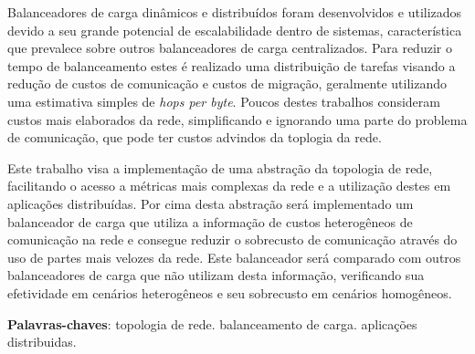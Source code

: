 \documentclass[
	12pt,				%
	openright,			%
	twoside,			%
	a4paper,			%
	english,			%
	brazil,				%
	]{abntex2}
\begin{document}
\begin{resumo}

Balanceadores de carga dinâmicos e distribuídos foram desenvolvidos e utilizados devido a seu grande potencial de escalabilidade dentro de sistemas, característica que prevalece sobre outros balanceadores de carga centralizados. Para reduzir o tempo de balanceamento estes é realizado uma distribuição de tarefas  visando a redução de custos de comunicação e custos de migração, geralmente utilizando uma estimativa simples de \textit{hops per byte}. Poucos destes trabalhos consideram custos mais elaborados da rede, simplificando e ignorando uma parte do problema de comunicação, que pode ter custos advindos da toplogia da rede.

Este trabalho visa a implementação de uma abstração da topologia de rede, facilitando o acesso a métricas mais complexas da rede e a utilização destes em aplicações distribuídas. Por cima desta abstração será implementado um balanceador de carga que utiliza a informação de custos heterogêneos de comunicação na rede e consegue reduzir o sobrecusto de comunicação através do uso de partes mais velozes da rede. Este balanceador será comparado com outros balanceadores de carga que não utilizam desta informação, verificando sua efetividade em cenários heterogêneos e seu sobrecusto em cenários homogêneos.



 \vspace{\onelineskip}
    
 \noindent
 \textbf{Palavras-chaves}: topologia de rede. balanceamento de carga. aplicações distribuidas.
 
\end{resumo}

\end{document}
